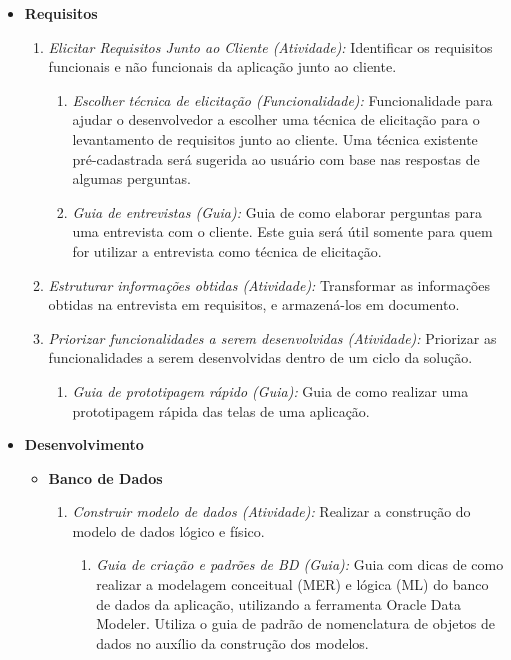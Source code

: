 \begin{itemize}
\item \textbf{Requisitos}
\begin{enumerate}
\item \textit{Elicitar Requisitos Junto ao Cliente (Atividade):} Identificar os requisitos funcionais e não funcionais da aplicação junto ao cliente.
\begin{enumerate}
\item \textit{Escolher técnica de elicitação (Funcionalidade):} Funcionalidade para ajudar o desenvolvedor a escolher uma técnica de elicitação para o levantamento de requisitos junto ao cliente. Uma técnica existente pré-cadastrada será sugerida ao usuário com base nas respostas de algumas perguntas.
\item \textit{Guia de entrevistas (Guia):} Guia de como elaborar perguntas para uma entrevista com o cliente. Este guia será útil somente para quem for utilizar a entrevista como técnica de elicitação.
\end{enumerate}
\item \textit{Estruturar informações obtidas (Atividade):} Transformar as informações obtidas na entrevista em requisitos, e armazená-los em documento.
\item \textit{Priorizar funcionalidades a serem desenvolvidas (Atividade):} Priorizar as funcionalidades a serem desenvolvidas dentro de um ciclo da solução.
\begin{enumerate}
\item \textit{Guia de prototipagem rápido (Guia):} Guia de como realizar uma prototipagem rápida das telas de uma aplicação.
\end{enumerate}
\end{enumerate}
\item \textbf{Desenvolvimento}
\begin{itemize}
\item \textbf{Banco de Dados}
\begin{enumerate}
\item \textit{Construir modelo de dados (Atividade):} Realizar a construção do modelo de dados lógico e físico.
\begin{enumerate}
\item \textit{Guia de criação e padrões de BD (Guia):} Guia com dicas de como realizar a modelagem conceitual (MER) e lógica (ML) do banco de dados da aplicação, utilizando a ferramenta Oracle Data Modeler. Utiliza o guia de padrão de nomenclatura de objetos de dados no auxílio da construção dos modelos.

\end{enumerate}
\end{enumerate}
\end{itemize}
\end{itemize}
